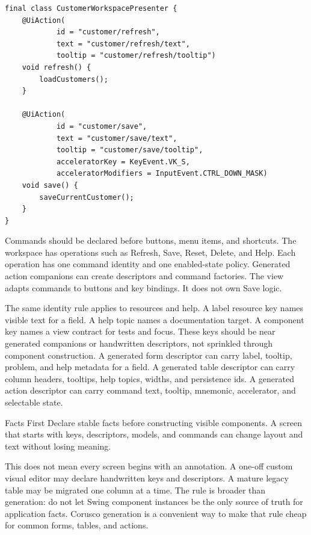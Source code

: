 \begin{lstlisting}[caption={Actions are declared before buttons.}]
final class CustomerWorkspacePresenter {
    @UiAction(
            id = "customer/refresh",
            text = "customer/refresh/text",
            tooltip = "customer/refresh/tooltip")
    void refresh() {
        loadCustomers();
    }

    @UiAction(
            id = "customer/save",
            text = "customer/save/text",
            tooltip = "customer/save/tooltip",
            acceleratorKey = KeyEvent.VK_S,
            acceleratorModifiers = InputEvent.CTRL_DOWN_MASK)
    void save() {
        saveCurrentCustomer();
    }
}
\end{lstlisting}

Commands should be declared before buttons, menu items, and shortcuts. The
workspace has operations such as Refresh, Save, Reset, Delete, and Help. Each
operation has one command identity and one enabled-state policy. Generated
action companions can create descriptors and command factories. The view
adapts commands to buttons and key bindings. It does not own Save logic.

The same identity rule applies to resources and help. A label resource key
names visible text for a field. A help topic names a documentation target. A
component key names a view contract for tests and focus. These keys should be
near generated companions or handwritten descriptors, not sprinkled through
component construction. A generated form descriptor can carry label, tooltip,
problem, and help metadata for a field. A generated table descriptor can carry
column headers, tooltips, help topics, widths, and persistence ids. A generated
action descriptor can carry command text, tooltip, mnemonic, accelerator, and
selectable state.

\begin{principlebox}{Facts First}
Declare stable facts before constructing visible components. A screen that
starts with keys, descriptors, models, and commands can change layout and text
without losing meaning.
\end{principlebox}

This does not mean every screen begins with an annotation. A one-off custom
visual editor may declare handwritten keys and descriptors. A mature legacy
table may be migrated one column at a time. The rule is broader than
generation: do not let Swing component instances be the only source of truth
for application facts. Corusco generation is a convenient way to make that
rule cheap for common forms, tables, and actions.

